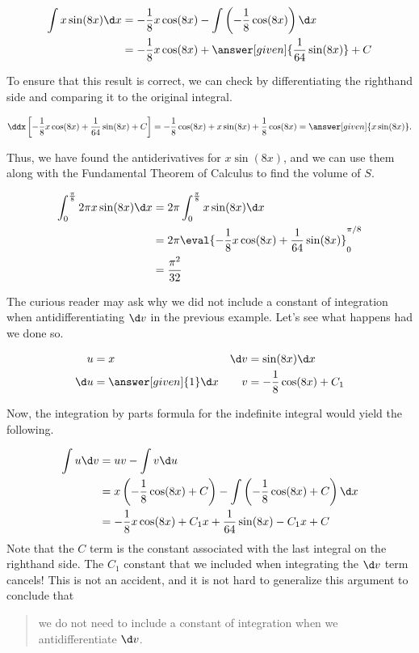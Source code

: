 \documentclass{ximera}
\begin{document}
\begin{model}
\begin{align*}
\int x\sin(8x) \d x &=-\frac{1}{8}x\cos(8x) -\int \left(-\frac{1}{8}\cos(8x)\right) \d x \\
&=-\frac{1}{8}x\cos(8x) + \answer[given]{\frac{1}{64}\sin(8x)} +C 
\end{align*}

To ensure that this result is correct, we can check by differentiating the righthand side and comparing it to the original integral.

\[
\ddx\left[-\frac{1}{8}x\cos(8x) +\frac{1}{64}\sin(8x) +C \right] = -\frac{1}{8} \cos(8x) +x \sin(8x) +\frac{1}{8} \cos(8x) = \answer[given]{x \sin(8x)}.
\]

Thus, we have found the antiderivatives for $x\sin(8x)$, and we can use them along with the Fundamental Theorem of Calculus to find the volume of $S$.

\begin{align*}
\int_{0}^{\frac{\pi}{8}} 2 \pi x\sin(8x) \d x &= 2 \pi \int_{0}^{\frac{\pi}{8}} x\sin(8x) \d x \\
&= 2 \pi \eval{ -\frac{1}{8}x\cos(8x) + \frac{1}{64}\sin(8x)}_0^{\pi/8}\\
&=\frac{\pi^{2}}{32}
\end{align*}

\begin{remark}
The curious reader may ask why we did not include a constant of integration when antidifferentiating $\d v$ in the previous example.  Let's see what happens had we done so.

\begin{align*}
u &= x & \d v & = \sin(8x) \d x \\
 \d u &= \answer[given]{1} \d x & v&=-\frac{1}{8}\cos(8x) +C_1
\end{align*}

Now, the integration by parts formula for the indefinite integral would yield the following.

\begin{align*}
\int u \d v &= uv -\int v \d u \\
 &=x \left(-\frac{1}{8}\cos(8x)+C\right) -\int \left(-\frac{1}{8}\cos(8x)+C\right) \d x \\
  &=-\frac{1}{8}x\cos(8x)+C_1x + \frac{1}{64}\sin(8x) -C_1x +C \\
\end{align*}
Note that the $C$ term is the constant associated with the last integral on the righthand side.  The $C_1$ constant that we included when integrating the $\d v$ term cancels!  This is not an accident, and it is not hard to generalize this argument to conclude that

\begin{quote}
we do not need to include a constant of integration when we antidifferentiate $\d v$.
\end{quote}
\end{remark}

\end{model}
\end{document}
